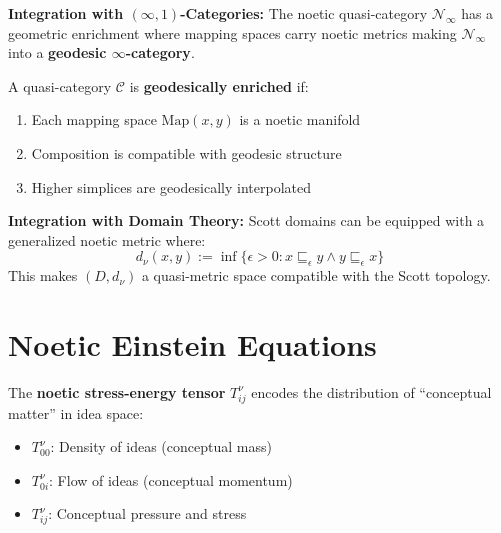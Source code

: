 \begin{tcolorbox}[colback=yellow!5!white,colframe=yellow!75!black,title=Cross-Reference: Higher Categories]
\textbf{Integration with $(\infty,1)$-Categories:} The noetic quasi-category
$\mathcal{N}_\infty$ has a geometric enrichment where mapping spaces carry
noetic metrics making $\mathcal{N}_\infty$ into a \textbf{geodesic $\infty$-category}.
\end{tcolorbox}

\begin{definition}
\label{def:geodesic-infty-cat}
A quasi-category $\mathcal{C}$ is \textbf{geodesically enriched} if:
\begin{enumerate}[label=(\roman*)]
    \item Each mapping space $\mathrm{Map}(x, y)$ is a noetic manifold
    \item Composition is compatible with geodesic structure
    \item Higher simplices are geodesically interpolated
\end{enumerate}
\end{definition}

\begin{tcolorbox}[colback=yellow!5!white,colframe=yellow!75!black,title=Cross-Reference: Domain Theory]
\textbf{Integration with Domain Theory:} Scott domains can be equipped with
a generalized noetic metric where:
\[
    d_\nu(x, y) := \inf\{\epsilon > 0 : x \sqsubseteq_\epsilon y \land y \sqsubseteq_\epsilon x\}
\]
This makes $(D, d_\nu)$ a quasi-metric space compatible with the Scott topology.
\end{tcolorbox}

\section{Noetic Einstein Equations}

\begin{definition}
\label{def:noetic-stress-energy}
The \textbf{noetic stress-energy tensor} $T^\nu_{ij}$ encodes the distribution
of ``conceptual matter'' in idea space:
\begin{itemize}
    \item $T^\nu_{00}$: Density of ideas (conceptual mass)
    \item $T^\nu_{0i}$: Flow of ideas (conceptual momentum)
    \item $T^\nu_{ij}$: Conceptual pressure and stress
\end{itemize}
\end{definition}

